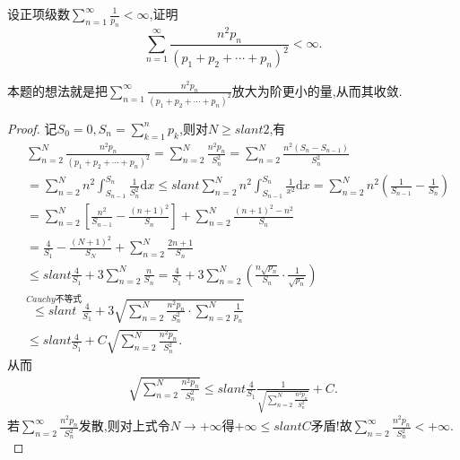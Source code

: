 \documentclass[../../main.tex]{subfiles}
\begin{document}
\begin{example}
设正项级数$\sum\limits_{n=1}^\infty \frac{1}{p_n}<\infty$,证明
$$\sum_{n=1}^\infty \frac{n^2 p_n}{(p_1+p_2+\cdots +p_n)^2}<\infty.$$
\end{example}
\begin{remark}
本题的想法就是把$\sum\limits_{n=1}^\infty \frac{n^2 p_n}{(p_1+p_2+\cdots +p_n)^2}$放大为阶更小的量,从而其收敛.
\end{remark}
\begin{proof}
记$S_0=0,S_n=\sum_{k=1}^n{p_k}$,则对$N\geqslant slant 2$,有
\begin{align*}
&\sum_{n=2}^N{\frac{n^2p_n}{(p_1+p_2+\cdots +p_n)^2}}=\sum_{n=2}^N{\frac{n^2p_n}{S_{n}^{2}}}=\sum_{n=2}^N{\frac{n^2\left( S_n-S_{n-1} \right)}{S_{n}^{2}}} \\
&=\sum_{n=2}^N{n^2\int_{S_{n-1}}^{S_n}{\frac{1}{S_{n}^{2}}\mathrm{d}x}}\leqslant slant \sum_{n=2}^N{n^2\int_{S_{n-1}}^{S_n}{\frac{1}{x^2}\mathrm{d}x}}=\sum_{n=2}^N{n^2\left( \frac{1}{S_{n-1}}-\frac{1}{S_n} \right)} \\
&=\sum_{n=2}^N{\left[ \frac{n^2}{S_{n-1}}-\frac{\left( n+1 \right) ^2}{S_n} \right]}+\sum_{n=2}^N{\frac{\left( n+1 \right) ^2-n^2}{S_n}} \\
&=\frac{4}{S_1}-\frac{\left( N+1 \right) ^2}{S_N}+\sum_{n=2}^N{\frac{2n+1}{S_n}} \\
&\leqslant slant \frac{4}{S_1}+3\sum_{n=2}^N{\frac{n}{S_n}}=\frac{4}{S_1}+3\sum_{n=2}^N{\left( \frac{n\sqrt{p_n}}{S_n}\cdot \frac{1}{\sqrt{p_n}} \right)} \\
&\overset{Cauchy\text{不等式}}{\leqslant slant}\frac{4}{S_1}+3\sqrt{\sum_{n=2}^N{\frac{n^2p_n}{S_{n}^{2}}}\cdot \sum_{n=2}^N{\frac{1}{p_n}}} \\
&\leqslant slant \frac{4}{S_1}+C\sqrt{\sum_{n=2}^N{\frac{n^2p_n}{S_{n}^{2}}}}.
\end{align*}
从而
\begin{align*}
\sqrt{\sum_{n=2}^N{\frac{n^2p_n}{S_{n}^{2}}}}\leqslant slant \frac{4}{S_1}\frac{1}{\sqrt{\sum\limits_{n=2}^N{\frac{n^2p_n}{S_{n}^{2}}}}}+C.
\end{align*}
若$\sum_{n=2}^{\infty}{\frac{n^2p_n}{S_{n}^{2}}}$发散,则对上式令$N\rightarrow +\infty$得$+\infty \leqslant slant C$矛盾!故$\sum_{n=2}^{\infty}{\frac{n^2p_n}{S_{n}^{2}}}<+\infty .$
\end{proof}
\end{document}
